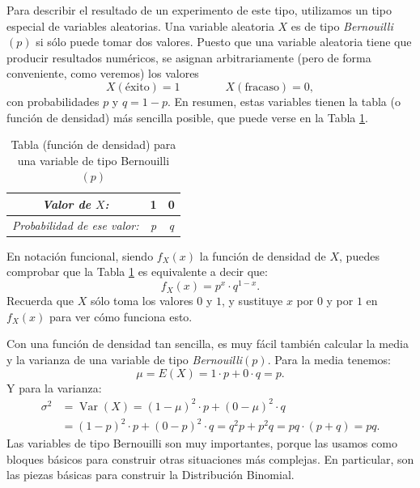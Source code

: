 Para describir el resultado de un experimento de este tipo, utilizamos un tipo especial de variables aleatorias. Una variable aleatoria $X$ es de tipo {\em Bernouilli$(p)$}
si sólo puede tomar dos valores. Puesto que una variable aleatoria tiene que producir resultados numéricos, se asignan arbitrariamente (pero de forma conveniente, como veremos) los valores
\[X(\text{éxito})= 1\qquad\qquad X(\text{fracaso})= 0,\]
con probabilidades $p$ y $q=1-p$. En resumen, estas variables tienen la tabla (o función de densidad) más sencilla posible, que puede verse  en la Tabla \ref{cap05:tabla:FuncionDensidadVariableBernouilli}.
    \begin{table}[hp]
    \begin{center}{\bf
    \begin{tabular}[t]{|c|c|c|}
        \hline
        \rule{0cm}{0.5cm}{\em Valor de $X$:}&1&0\\
        \hline
        \rule{0cm}{0.7cm}{\em Probabilidad de ese valor:}&{\em p}&{\em q}\\
        \hline
    \end{tabular}}
    \end{center}
    \label{cap05:tabla:FuncionDensidadVariableBernouilli}
    \caption{Tabla (función de densidad) para una variable de tipo Bernouilli$(p)$}
    \end{table}

\noindent En notación funcional, siendo $f_X(x)$ la función de densidad de $X$,  puedes comprobar que la Tabla \ref{cap05:tabla:FuncionDensidadVariableBernouilli} es equivalente a decir que:
\begin{equation}
\label{cap05:ecu:FuncionDensidadVariableBernouilli}
f_X(x)=p^{x}\cdot q^{1-x}.
\end{equation}
Recuerda que $X$ sólo toma los valores $0$ y $1$, y sustituye $x$ por $0$ y por $1$ en $f_X(x)$ para ver cómo funciona esto.

Con una función de densidad tan sencilla, es muy fácil también calcular la media y la varianza de una variable de tipo {\em Bernouilli$(p)$}. Para la media tenemos:
    \begin{equation}\label{cap05:ecu:MediaVariableBernouilli}
    \mu=E(X)=1\cdot p+0\cdot q=p.
    \end{equation}
Y para la varianza:
    \begin{equation}\label{cap05:ecu:VarianzaVariableBernouilli}
    \begin{array}{rl}
    \sigma^2& =\operatorname{Var}(X)=(1-\mu)^2\cdot p+(0-\mu)^2\cdot q\\
     &=(1-p)^2\cdot p+(0-p)^2\cdot q=q^2p+p^2q=pq\cdot(p+q)=pq.
    \end{array}
    \end{equation}
Las variables de tipo Bernouilli son muy importantes, porque las usamos como bloques básicos para construir otras situaciones más complejas. En particular, son las piezas básicas para construir la Distribución Binomial.

